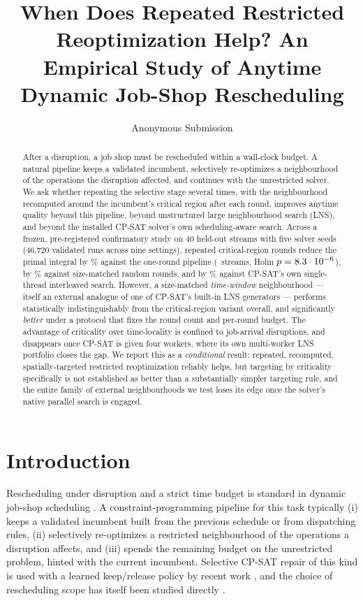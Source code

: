 \documentclass[letterpaper]{article} %
\title{When Does Repeated Restricted Reoptimization Help? An Empirical Study of Anytime Dynamic Job-Shop Rescheduling}
\author{
    Anonymous Submission
}
\begin{document}
\maketitle

\begin{abstract}
After a disruption, a job shop must be rescheduled within a wall-clock budget. A natural pipeline keeps a validated incumbent, selectively re-optimizes a neighbourhood of the operations the disruption affected, and continues with the unrestricted solver. We ask whether repeating the selective stage several times, with the neighbourhood recomputed around the incumbent's critical region after each round, improves anytime quality beyond this pipeline, beyond unstructured large neighbourhood search (LNS), and beyond the installed CP-SAT solver's own scheduling-aware search. Across a frozen, pre-registered confirmatory study on 40 held-out streams with five solver seeds (46{,}720 validated runs across nine settings), repeated critical-region rounds reduce the primal integral by \UOneBTwocritVsBZeroiaipRel\% against the one-round pipeline (\UOneBTwocritVsBZeroiaipWL\ streams, Holm $p=8.3\cdot10^{-6}$), by \UOneBTwocritVsBOnerandomRel\% against size-matched random rounds, and by \UOneBTwocritVsBFivenativeOnewRel\% against CP-SAT's own single-thread interleaved search. However, a size-matched \emph{time-window} neighbourhood --- itself an external analogue of one of CP-SAT's built-in LNS generators --- performs statistically indistinguishably from the critical-region variant overall, and significantly \emph{better} under a protocol that fixes the round count and per-round budget. The advantage of criticality over time-locality is confined to job-arrival disruptions, and disappears once CP-SAT is given four workers, where its own multi-worker LNS portfolio closes the gap. We report this as a \emph{conditional} result: repeated, recomputed, spatially-targeted restricted reoptimization reliably helps, but targeting by criticality specifically is not established as better than a substantially simpler targeting rule, and the entire family of external neighbourhoods we test loses its edge once the solver's native parallel search is engaged.
\end{abstract}

\section{Introduction}

Rescheduling under disruption and a strict time budget is standard in dynamic job-shop scheduling \citep{vieira2003,ouelhadj2009}. A constraint-programming pipeline for this task typically (i) keeps a validated incumbent built from the previous schedule or from dispatching rules, (ii) selectively re-optimizes a restricted neighbourhood of the operations a disruption affects, and (iii) spends the remaining budget on the unrestricted problem, hinted with the current incumbent. Selective CP-SAT repair of this kind is used with a learned keep/release policy by recent work \citep{linyang2026}, and the choice of rescheduling scope has itself been studied directly \citep{sun2026}.
\end{document}
